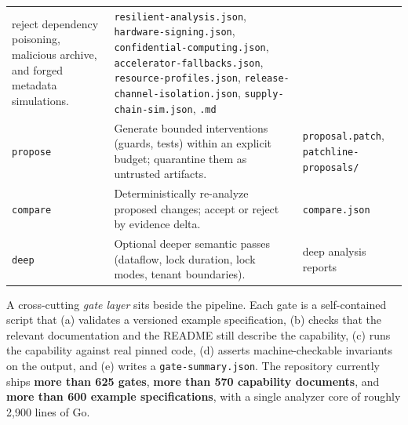 \documentclass[11pt]{article}
\newcommand{\code}[1]{\texttt{#1}}
\begin{document}
\begin{longtable}{>{\raggedright\arraybackslash}p{2.3cm}>{\raggedright\arraybackslash}p{8.2cm}>{\raggedright\arraybackslash}p{3.4cm}}
reject dependency poisoning, malicious archive, and forged metadata simulations. & \code{resilient-analysis.json}, \code{hardware-signing.json}, \code{confidential-computing.json}, \code{accelerator-fallbacks.json}, \code{resource-profiles.json}, \code{release-channel-isolation.json}, \code{supply-chain-sim.json}, \code{.md} \\
\code{propose} & Generate bounded interventions (guards, tests) within an explicit budget; quarantine
them as untrusted artifacts. & \code{proposal.patch}, \code{patchline-proposals/} \\
\code{compare} & Deterministically re-analyze proposed changes; accept or reject by evidence delta. &
\code{compare.json} \\
\code{deep} & Optional deeper semantic passes (dataflow, lock duration, lock modes, tenant boundaries). & deep
analysis reports \\
\bottomrule
\end{longtable}

\noindent
A cross-cutting \emph{gate layer} sits beside the pipeline. Each gate is a self-contained script that
(a) validates a versioned example specification, (b) checks that the relevant documentation and the
README still describe the capability, (c) runs the capability against real pinned code, (d) asserts
machine-checkable invariants on the output, and (e) writes a \code{gate-summary.json}. The repository
currently ships \textbf{more than 625 gates}, \textbf{more than 570 capability documents}, and \textbf{more than 600 example
specifications}, with a single analyzer core of roughly 2{,}900 lines of Go.
\end{document}
